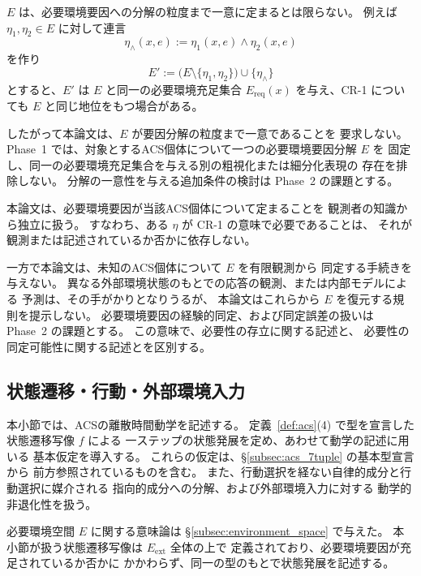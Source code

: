 \begin{remark}[要因分解の非一意性]
\label{rem:factor_nonuniqueness}
$E$ は、必要環境要因への分解の粒度まで一意に定まるとは限らない。
例えば $\eta_1,\eta_2\in E$ に対して連言
\[
  \eta_\wedge(x,e)
  :=
  \eta_1(x,e)\wedge\eta_2(x,e)
\]
を作り
\[
  E'
  :=
  \bigl(E\setminus\{\eta_1,\eta_2\}\bigr)\cup\{\eta_\wedge\}
\]
とすると、$E'$ は $E$ と同一の必要環境充足集合
$E_{\mathrm{req}}(x)$
を与え、CR-1 についても $E$ と同じ地位をもつ場合がある。

したがって本論文は、$E$ が要因分解の粒度まで一意であることを
要求しない。
Phase~1 では、対象とするACS個体について一つの必要環境要因分解 $E$ を
固定し、同一の必要環境充足集合を与える別の粗視化または細分化表現の
存在を排除しない。
分解の一意性を与える追加条件の検討は Phase~2 の課題とする。
\end{remark}

\begin{remark}[必要性の存立と同定可能性]
\label{rem:necessity_identification}
本論文は、必要環境要因が当該ACS個体について定まることを
観測者の知識から独立に扱う。
すなわち、ある $\eta$ が CR-1 の意味で必要であることは、
それが観測または記述されているか否かに依存しない。

一方で本論文は、未知のACS個体について $E$ を有限観測から
同定する手続きを与えない。
異なる外部環境状態のもとでの応答の観測、または内部モデルによる
予測は、その手がかりとなりうるが、
本論文はこれらから $E$ を復元する規則を提示しない。
必要環境要因の経験的同定、および同定誤差の扱いは
Phase~2 の課題とする。
この意味で、必要性の存立に関する記述と、
必要性の同定可能性に関する記述とを区別する。
\end{remark}

\subsection{状態遷移・行動・外部環境入力}
\label{subsec:state_space_basic_variables}

本小節では、ACSの離散時間動学を記述する。
定義~\ref{def:acs}(4) で型を宣言した状態遷移写像 $f$ による
一ステップの状態発展を定め、あわせて動学の記述に用いる
基本仮定を導入する。
これらの仮定は、\S\ref{subsec:acs_7tuple} の基本型宣言から
前方参照されているものを含む。
また、行動選択を経ない自律的成分と行動選択に媒介される
指向的成分への分解、および外部環境入力に対する
動学的非退化性を扱う。

必要環境空間 $E$ に関する意味論は
\S\ref{subsec:environment_space} で与えた。
本小節が扱う状態遷移写像は $E_{\mathrm{ext}}$ 全体の上で
定義されており、必要環境要因が充足されているか否かに
かかわらず、同一の型のもとで状態発展を記述する。


